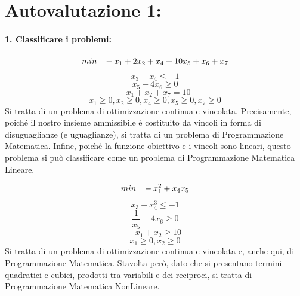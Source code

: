 \section{Autovalutazione 1:}


\paragraph{1. Classificare i problemi:} 
\begin{equation*}
min \hspace{0.3cm} -x_1 + 2x_2 + x_4 + 10x_5 + x_6 + x_7 
\end{equation*}
\begin{equation*}
    x_3 - x_4 \leq -1
\end{equation*}
\begin{equation*}
    x_5 -4x_6 \geq 0
\end{equation*}
\begin{equation*}
-x_1 + x_2 + x_7 = 10 
\end{equation*}
\begin{equation*}
x_1 \geq 0, x_2 \geq 0, x_4 \geq 0, x_5 \geq 0, x_7 \geq 0
\end{equation*}
Si tratta di un problema di ottimizzazione continua e vincolata. Precisamente, poiché il nostro insieme ammissibile è costituito da vincoli in forma di disuguaglianze (e uguaglianze), si tratta di un problema di Programmazione Matematica. Infine, poiché la funzione obiettivo e i vincoli sono lineari, questo problema si può classificare come un problema di Programmazione Matematica Lineare.

\vspace{0.2cm}

\begin{equation*}
min \hspace{0.3cm} -x_1^2 + x_4x_5 
\end{equation*}
\begin{equation*}
    x_3 - x_4^3 \leq -1
\end{equation*}
\begin{equation*}
    \frac{1}{x_5} - 4x_6 \geq 0
\end{equation*}
\begin{equation*}
    -x_1 + x_2 \geq 10 
\end{equation*}
\begin{equation*}
x_1 \geq 0, x_2 \geq 0
\end{equation*}
Si tratta di un problema di ottimizzazione continua e vincolata e, anche qui, di Programmazione Matematica. Stavolta però, dato che si presentano termini quadratici e cubici, prodotti tra variabili e dei reciproci, si tratta di Programmazione Matematica NonLineare.

